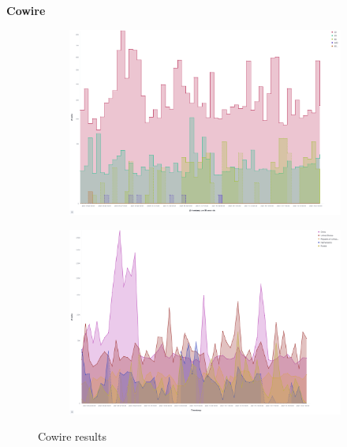 \textbf{Cowire}

\begin{figure}
    \centering

    \begin{subfigure}[b]{0.49\textwidth}
        \centering
        \includegraphics[width=\textwidth]{figures/tpot-cowire-attacks.png}
        \caption{}
        \label{fig:tpot-cowire-attacks}
    \end{subfigure}
    \hfill
    \begin{subfigure}[b]{0.49\textwidth}
        \centering
        \includegraphics[width=\textwidth]{figures/tpot-cowire-country.png}
        \caption{}
        \label{fig:tpot-cowire-country}
    \end{subfigure}
    \caption[Cowire results]{Cowire results}
    \label{fig:cowire}
\end{figure}

